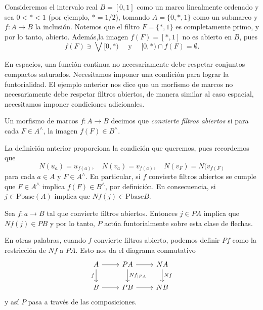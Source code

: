 \begin{ej}\label{Ejemplo7.2.1}
    Consideremos el intervalo real $B=[0,1]$ como un marco linealmente ordenado y sea $0< * < 1$ (por ejemplo, $*=1/2$), tomando $A=\{0, *, 1\}$ como un submarco y $f\colon A\to B$ la inclusión. Notemos que el filtro $F=\{*, 1\}$ es completamente primo, y por lo tanto, abierto. Además,la imagen $f(F)=[*, 1]$ no es abierto en $B$, pues 
    \[
    f(F)\ni \bigvee [0, *)\quad \mbox{ y }\quad[0, *)\cap f(F)=\emptyset.
    \]
\end{ej}

En espacios, una función continua no necesariamente debe respetar conjuntos compactos saturados. Necesitamos imponer una condición para lograr la funtorialidad. El ejemplo anterior nos dice que un morfismo de marcos no necesariamente debe respetar filtros abiertos, de manera similar al caso espacial, necesitamos imponer condiciones adicionales.\\

\begin{dfn}\label{Definicion7.2.2}
    Un morfismo de marcos $f\colon A\to B$ decimos que \emph{convierte filtros abiertos} si para cada $F\in A^\wedge$, la imagen $f(F)\in B^\wedge$.
\end{dfn}

La definición anterior proporciona la condición que queremos, pues recordemos que 
\[
N(u_a)=u_{f(a)},\quad N(v_a)=v_{f(a)},\quad N(v_F)=N(v_{f(F)}
\]
para cada $a\in A$ y $F\in A^\wedge$. En particular, si $f$ convierte filtros abiertos se cumple que $F\in A^\wedge$ implica $f(F)\in B^\wedge$, por definición. En consecuencia, si $j\in \mbox{Pbase}(A)$ implica que $Nf(j)\in \mbox{Pbase}B$.\\

\begin{lem}\label{Lema7.2.3}
    Sea $f\colon a\to B$ tal que convierte filtros abiertos. Entonces $j\in PA$ implica que $Nf(j)\in PB$ y por lo tanto, $P$ actúa funtorialmente sobre esta clase de flechas.
\end{lem}

En otras palabras, cuando $f$ convierte filtros abierto, podemos definir $Pf$ como la restricción de $Nf$ a $PA$. Esto nos da el diagrama conmutativo
\[\begin{tikzcd}
	A & PA & NA \\
	B & PB & NB
	\arrow[from=1-1, to=1-2]
	\arrow["f"', from=1-1, to=2-1]
	\arrow[from=1-2, to=1-3]
	\arrow["{Nf_{\mid PA}}", from=1-2, to=2-2]
	\arrow["Nf", from=1-3, to=2-3]
	\arrow[from=2-1, to=2-2]
	\arrow[from=2-2, to=2-3]
\end{tikzcd}\]
y así $P$ pasa a través de las composiciones.\\

